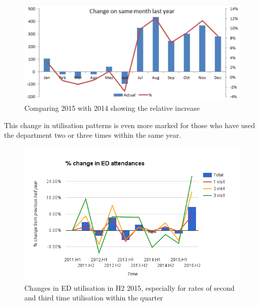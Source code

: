 \documentclass[11pt,a4paper]{article}
\begin{document}
\begin{figure}[htp]
\centering
\includegraphics[scale=0.35]{ED.png}
\caption{Comparing 2015 with 2014 showing the relative increase}
\label{Relative changes in ED utilization}
\end{figure}


This change in utilisation patterns is even more marked for those who have used the department two or three times within the same year.\\


\begin{figure}[htp]
\centering
\includegraphics[scale=0.70]{Fchange.png}
\caption{Changes in ED utilisation in H2 2015, especially for rates of second and third time utilisation within the quarter}
\label{Changes in ED utilisation}
\end{figure}
\end{document}
